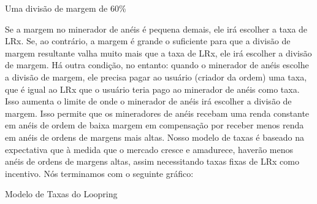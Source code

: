 \documentclass[UTF8,nofonts]{article}
\makeatletter
\newenvironment{figurehere}
 {\def\@captype{figure}}
 {}
\makeatother
\begin{document}
\begin{multicols}{2}
\begin{center}
\begin{figurehere}
\caption{Uma divisão de margem de 60\%}
\label{fig:marginsplit}
\end{figurehere}
\end{center}

Se a margem no minerador de anéis é pequena demais, ele irá escolher a taxa de LRx. Se, ao contrário, a margem é grande o suficiente para que a divisão de margem resultante valha muito mais que a taxa de LRx, ele irá escolher a divisão de margem. Há outra condição, no entanto: quando o minerador de anéis escolhe a divisão de margem, ele precisa pagar ao usuário (criador da ordem) uma taxa, que é igual ao LRx que o usuário teria pago ao minerador de anéis como taxa. Isso aumenta o limite de onde o minerador de anéis irá escolher a divisão de margem. Isso permite que os mineradores de anéis recebam uma renda constante em anéis de ordem de baixa margem em compensação por receber menos renda em anéis de ordens de margens mais altas. Nosso modelo de taxas é baseado na expectativa que à medida que o mercado cresce e amadurece, haverão menos anéis de ordens de margens altas, assim necessitando taxas fixas de LRx como incentivo.
Nós terminamos com o seguinte gráfico:

\begin{center}
\begin{figurehere}
\centering
{}
\caption{Modelo de Taxas do Loopring}
\label{fig:feemodel}
\end{figurehere}
\end{center}


\end{multicols}
\end{document}
